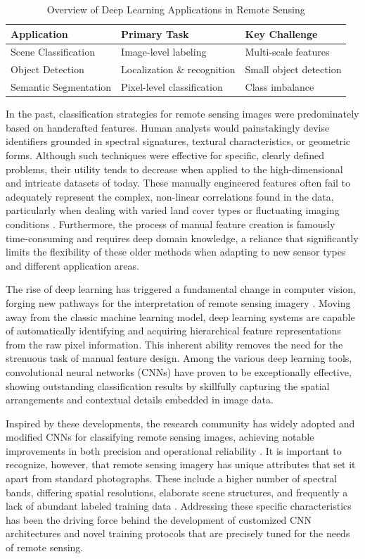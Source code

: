 \documentclass[12pt,a4paper]{article}
\begin{document}
\begin{table}[htbp]
\centering
\caption{Overview of Deep Learning Applications in Remote Sensing}
\label{tab:applications}
\begin{tabular}{@{}lll@{}}
\toprule
\textbf{Application} & \textbf{Primary Task} & \textbf{Key Challenge} \\ 
\midrule
Scene Classification & Image-level labeling & Multi-scale features \\
Object Detection & Localization \& recognition & Small object detection \\
Semantic Segmentation & Pixel-level classification & Class imbalance \\
\bottomrule
\end{tabular}
\end{table}

In the past, classification strategies for remote sensing images were predominately based on handcrafted features. Human analysts would painstakingly devise identifiers grounded in spectral signatures, textural characteristics, or geometric forms. Although such techniques were effective for specific, clearly defined problems, their utility tends to decrease when applied to the high-dimensional and intricate datasets of today. These manually engineered features often fail to adequately represent the complex, non-linear correlations found in the data, particularly when dealing with varied land cover types or fluctuating imaging conditions \cite{cheng2016survey}. Furthermore, the process of manual feature creation is famously time-consuming and requires deep domain knowledge, a reliance that significantly limits the flexibility of these older methods when adapting to new sensor types and different application areas.

The rise of deep learning has triggered a fundamental change in computer vision, forging new pathways for the interpretation of remote sensing imagery \cite{zhu2017deep}. Moving away from the classic machine learning model, deep learning systems are capable of automatically identifying and acquiring hierarchical feature representations from the raw pixel information. This inherent ability removes the need for the strenuous task of manual feature design. Among the various deep learning tools, convolutional neural networks (CNNs) have proven to be exceptionally effective, showing outstanding classification results by skillfully capturing the spatial arrangements and contextual details embedded in image data.

Inspired by these developments, the research community has widely adopted and modified CNNs for classifying remote sensing images, achieving notable improvements in both precision and operational reliability \cite{liu2019learning}. It is important to recognize, however, that remote sensing imagery has unique attributes that set it apart from standard photographs. These include a higher number of spectral bands, differing spatial resolutions, elaborate scene structures, and frequently a lack of abundant labeled training data \cite{cheng2016survey}. Addressing these specific characteristics has been the driving force behind the development of customized CNN architectures and novel training protocols that are precisely tuned for the needs of remote sensing.
\end{document}
